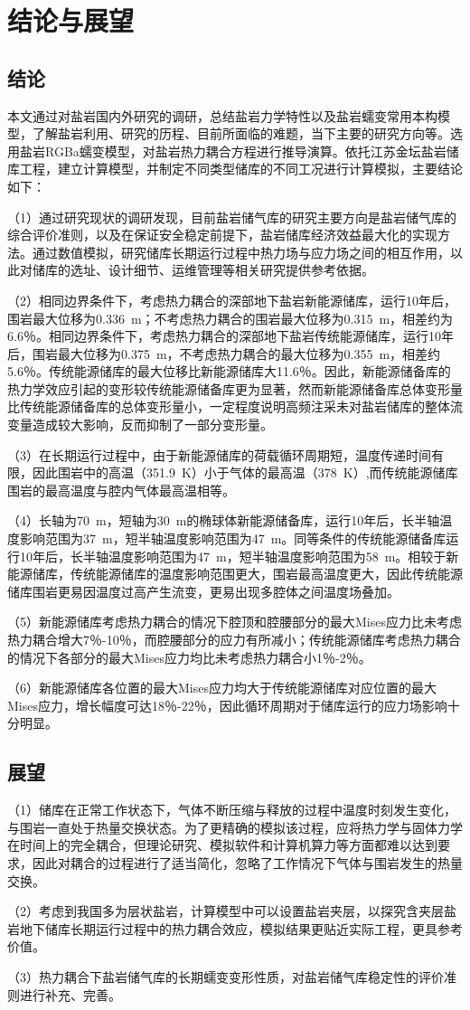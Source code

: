 \chapter{结论与展望}
\section{结论}

本文通过对盐岩国内外研究的调研，总结盐岩力学特性以及盐岩蠕变常用本构模型，了解盐岩利用、研究的历程、目前所面临的难题，当下主要的研究方向等。选用盐岩RGBa蠕变模型，对盐岩热力耦合方程进行推导演算。依托江苏金坛盐岩储库工程，建立计算模型，并制定不同类型储库的不同工况进行计算模拟，主要结论如下：

（1）通过研究现状的调研发现，目前盐岩储气库的研究主要方向是盐岩储气库的综合评价准则，以及在保证安全稳定前提下，盐岩储库经济效益最大化的实现方法。通过数值模拟，研究储库长期运行过程中热力场与应力场之间的相互作用，以此对储库的选址、设计细节、运维管理等相关研究提供参考依据。

（2）相同边界条件下，考虑热力耦合的深部地下盐岩新能源储库，运行\num{10}年后，围岩最大位移为\SI{0.336}{m}；不考虑热力耦合的围岩最大位移为\SI{0.315}{m}，相差约为6.6％。相同边界条件下，考虑热力耦合的深部地下盐岩传统能源储库，运行\num{10}年后，围岩最大位移为\SI{0.375}{m}，不考虑热力耦合的最大位移为\SI{0.355}{m}，相差约5.6％。传统能源储库的最大位移比新能源储库大11.6％。因此，新能源储备库的热力学效应引起的变形较传统能源储备库更为显著，然而新能源储备库总体变形量比传统能源储备库的总体变形量小，一定程度说明高频注采未对盐岩储库的整体流变量造成较大影响，反而抑制了一部分变形量。

（3）在长期运行过程中，由于新能源储库的荷载循环周期短，温度传递时间有限，因此围岩中的高温（\SI{351.9}{K}）小于气体的最高温（\SI{378}{K}）,而传统能源储库围岩的最高温度与腔内气体最高温相等。

（4）长轴为\SI{70}{m}，短轴为\SI{30}{m}的椭球体新能源储备库，运行10年后，长半轴温度影响范围为\SI{37}{m}，短半轴温度影响范围为\SI{47}{m}。同等条件的传统能源储备库运行10年后，长半轴温度影响范围为\SI{47}{m}，短半轴温度影响范围为\SI{58}{m}。相较于新能源储库，传统能源储库的温度影响范围更大，围岩最高温度更大，因此传统能源储库围岩更易因温度过高产生流变，更易出现多腔体之间温度场叠加。

（5）新能源储库考虑热力耦合的情况下腔顶和腔腰部分的最大Mises应力比未考虑热力耦合增大7％-10％，而腔腰部分的应力有所减小；传统能源储库考虑热力耦合的情况下各部分的最大Mises应力均比未考虑热力耦合小1％-2％。

（6）新能源储库各位置的最大Mises应力均大于传统能源储库对应位置的最大Mises应力，增长幅度可达18％-22％，因此循环周期对于储库运行的应力场影响十分明显。%

\section{展望}

（1）储库在正常工作状态下，气体不断压缩与释放的过程中温度时刻发生变化，与围岩一直处于热量交换状态。为了更精确的模拟该过程，应将热力学与固体力学在时间上的完全耦合，但理论研究、模拟软件和计算机算力等方面都难以达到要求，因此对耦合的过程进行了适当简化，忽略了工作情况下气体与围岩发生的热量交换。

（2）考虑到我国多为层状盐岩，计算模型中可以设置盐岩夹层，以探究含夹层盐岩地下储库长期运行过程中的热力耦合效应，模拟结果更贴近实际工程，更具参考价值。

（3）热力耦合下盐岩储气库的长期蠕变变形性质，对盐岩储气库稳定性的评价准则进行补充、完善。